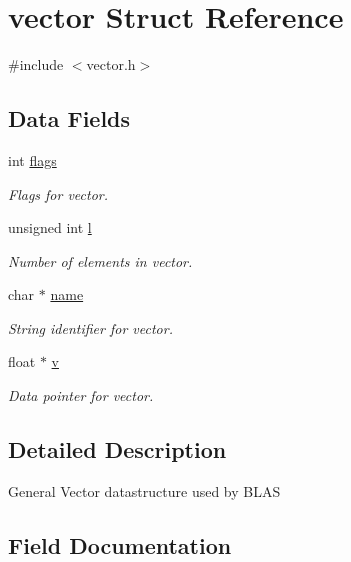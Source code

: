 \hypertarget{structvector}{}\section{vector Struct Reference}
\label{structvector}


{\ttfamily \#include $<$vector.\+h$>$}

\subsection*{Data Fields}
\begin{DoxyCompactItemize}
\item 
int \hyperlink{structvector_ae4c86a32c9c70758bf4556732ded4137}{flags}
\begin{DoxyCompactList}\small\item\em Flags for vector. \end{DoxyCompactList}\item 
unsigned int \hyperlink{structvector_a95c5d324db1053c979145cea94d5263e}{l}
\begin{DoxyCompactList}\small\item\em Number of elements in vector. \end{DoxyCompactList}\item 
char $\ast$ \hyperlink{structvector_a82a48e76e3d8d73bc769bdca1a80a382}{name}
\begin{DoxyCompactList}\small\item\em String identifier for vector. \end{DoxyCompactList}\item 
float $\ast$ \hyperlink{structvector_a83630325b605afe4bf7532c82b86940d}{v}
\begin{DoxyCompactList}\small\item\em Data pointer for vector. \end{DoxyCompactList}\end{DoxyCompactItemize}


\subsection{Detailed Description}
General Vector datastructure used by B\+L\+AS 

\subsection{Field Documentation}
\mbox{\label{structvector_ae4c86a32c9c70758bf4556732ded4137}} 
